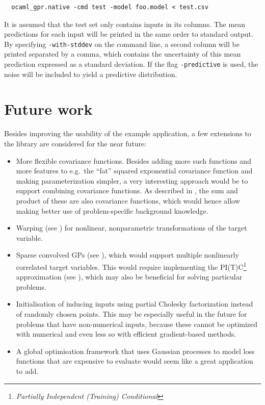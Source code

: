 \documentclass[10pt]{report}
\begin{document}
\begin{verbatim}
  ocaml_gpr.native -cmd test -model foo.model < test.csv
\end{verbatim}

It is assumed that the test set only contains inputs in its columns.  The mean
predictions for each input will be printed in the same order to standard
output.\\

By specifying \verb=-with-stddev= on the command line, a second column will be
printed separated by a comma, which contains the uncertainty of this mean
prediction expressed as a standard deviation.  If the flag \verb=-predictive= is
used, the noise will be included to yield a predictive distribution.

\chapter{Future work}

Besides improving the usability of the example application, a few extensions to
the library are considered for the near future:

\begin{itemize}
\item More flexible covariance functions.  Besides adding more such functions
and more features to e.g.\ the ``fat'' squared exponential covariance function
and making parameterization simpler, a very interesting approach would be to
support combining covariance functions.  As described in
\cite{oai:eprints.pascal-network.org:1211}, the sum and product of these are
also covariance functions, which would hence allow making better use of
problem-specific background knowledge.
\item Warping (see \cite{conf/nips/SnelsonRG03}) for nonlinear, nonparametric
transformations of the target variable.
\item Sparse convolved GPs (see \cite{DBLP:conf/nips/AlvarezL08}), which would
support multiple nonlinearly correlated target variables.  This would require
implementing the PI(T)C\footnote{\emph{Partially Independent (Training)
Conditional}} approximation (see \cite{SnelsonThesis}), which may also be
beneficial for solving particular problems.
\item Initialisation of inducing inputs using partial Cholesky factorization
instead of randomly chosen points.  This may be especially useful in the future
for problems that have non-numerical inputs, because these cannot be optimized
with numerical and even less so with efficient gradient-based methods.
\item A global optimisation framework that uses Gaussian processes to model loss
functions that are expensive to evaluate would seem like a great application to
add.
\end{itemize}
\end{document}
